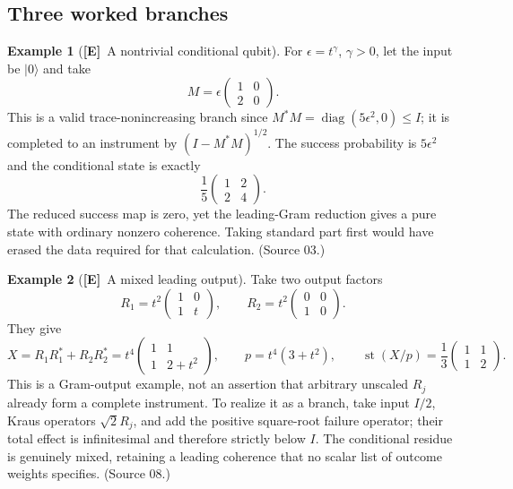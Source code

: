 \documentclass[11pt,oneside]{article}
\numberwithin{equation}{section}
\theoremstyle{plain}
\theoremstyle{definition}
\newtheorem{example}[example]{Example}
\theoremstyle{remark}
\DeclareMathOperator{\st}{st}
\DeclareMathOperator{\diag}{diag}
\newcommand{\ket}[1]{\lvert#1\rangle}
\newcommand{\TE}{\textcolor{TierE}{\textsf{\bfseries[E]}}}
\begin{document}
\subsection{Three worked branches}
\begin{example}[\TE\ A nontrivial conditional qubit]\label{qgs:obs:ex:qubit}
For $\epsilon=t^\gamma$, $\gamma>0$, let the input be $\ket0$ and take
\[
 M=\epsilon\begin{pmatrix}1&0\\2&0\end{pmatrix}.
\]
This is a valid trace-nonincreasing branch since $M^*M=\diag(5\epsilon^2,0)\le I$; it is completed to an instrument by $(I-M^*M)^{1/2}$. The success probability is $5\epsilon^2$ and the conditional state is exactly
\[
 \frac15\begin{pmatrix}1&2\\2&4\end{pmatrix}.
\]
The reduced success map is zero, yet the leading-Gram reduction gives a pure state with ordinary nonzero coherence. Taking standard part first would have erased the data required for that calculation. (Source 03.)
\end{example}

\begin{example}[\TE\ A mixed leading output]\label{qgs:ops:ex:mixed}
Take two output factors
\[
 R_1=t^2\begin{pmatrix}1&0\\1&t\end{pmatrix},\qquad
 R_2=t^2\begin{pmatrix}0&0\\1&0\end{pmatrix}.
\]
They give
\[
 X=R_1R_1^*+R_2R_2^*=t^4\begin{pmatrix}1&1\\1&2+t^2\end{pmatrix},\qquad
 p=t^4(3+t^2),\qquad
 \st(X/p)=\frac13\begin{pmatrix}1&1\\1&2\end{pmatrix}.
\]
This is a Gram-output example, not an assertion that arbitrary unscaled $R_j$ already form a complete instrument. To realize it as a branch, take input $I/2$, Kraus operators $\sqrt2R_j$, and add the positive square-root failure operator; their total effect is infinitesimal and therefore strictly below $I$. The conditional residue is genuinely mixed, retaining a leading coherence that no scalar list of outcome weights specifies. (Source 08.)
\end{example}
\end{document}
